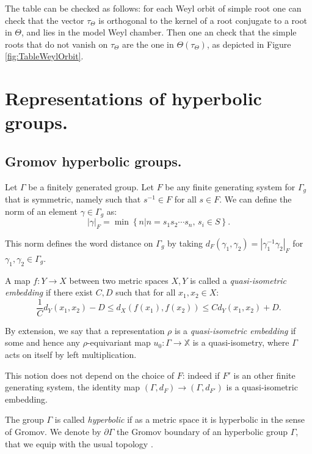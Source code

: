 \documentclass[reqno,10pt]{amsart}
\theoremstyle{plain}
\theoremstyle{definition}
\theoremstyle{remark}
\newtheorem{rem}[thm]{Remark}
\newcommand{\type}{\tau}
\newcommand{\X}{\mathbb{X}}
\newcommand{\ie}{namely }
\begin{document}
The table can be checked as follows: for each Weyl orbit of simple root one can check that the vector $\type_\Theta$ is orthogonal to the kernel of a root conjugate to a root in $\Theta$, and lies in the model Weyl chamber. Then one an check that the simple roots that do not vanish on $\type_\Theta$ are the one in $\Theta(\type_\Theta)$, as depicted in Figure \ref{fig:TableWeylOrbit}.


\section{Representations of hyperbolic groups.}
\label{sec:Representations}
\subsection{Gromov hyperbolic groups.}

Let $\Gamma$ be a finitely generated group. Let $F$ be any finite generating system for $\Gamma_g$ that is symmetric, \ie such that  $s^{-1}\in F$ for all $s\in F$. We can define the norm of an element $\gamma\in \Gamma_g$ as:
$$|\gamma|_F=\min\left\lbrace n|n=s_1s_2\cdots s_n, \, s_i\in S\right\rbrace.$$

This norm defines the word distance on $\Gamma_g$ by taking $d_F(\gamma_1,\gamma_2)=|\gamma_1^{-1}\gamma_2|_F$ for $\gamma_1,\gamma_2\in \Gamma_g$.


\medskip

A map $f:Y\to X$ between two metric spaces $X,Y$ is called a \emph{quasi-isometric embedding} if there exist $C,D$ such that for all $x_1,x_2\in X$:
$$\frac{1}{C}d_Y(x_1,x_2)-D\leq d_X(f(x_1),f(x_2))\leq Cd_Y(x_1,x_2)+D .$$

By extension, we say that a representation $\rho$ is a \emph{quasi-isometric embedding} if some and hence any $\rho$-equivariant map $u_0:\Gamma\to \X$ is a quasi-isometry, where $\Gamma$ acts on itself by left multiplication. 

 This notion does not depend on the choice of $F$: indeed if $F'$ is an other finite generating system, the identity map $(\Gamma, d_F)\to (\Gamma, d_{F'})$ is a quasi-isometric embedding.
 
 \medskip
 
The group $\Gamma$ is called \emph{hyperbolic} if as a metric space it is hyperbolic in the sense of Gromov. We denote by $\partial\Gamma$ the Gromov boundary of an hyperbolic group $\Gamma$, that we equip with the usual topology \cite{Gromov}.
\end{document}
